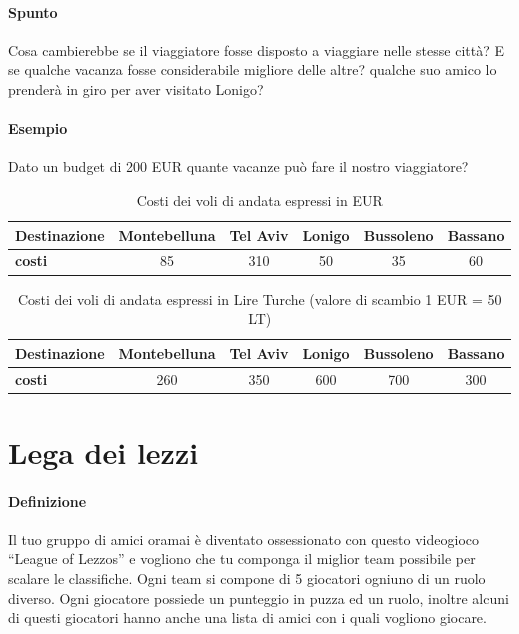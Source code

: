     \paragraph{Spunto} Cosa cambierebbe se il viaggiatore fosse disposto a viaggiare nelle stesse città? E se qualche vacanza fosse considerabile migliore delle altre? qualche suo amico lo prenderà in giro per aver visitato Lonigo?
    \paragraph{Esempio} Dato un budget di 200 EUR quante vacanze può fare il nostro viaggiatore?

    \begin{table}[h!]
        \centering
        \caption{Costi dei voli di andata espressi in EUR}
        \label{tab:costi_voli}
        \begin{tabular}{|l|c|c|c|c|c|}
        \hline
            \textbf{Destinazione} & \textbf{Montebelluna} & \textbf{Tel Aviv} & \textbf{Lonigo} & \textbf{Bussoleno} & \textbf{Bassano} \\ \hline
            \textbf{costi} & 85 & 310 & 50 & 35 & 60 \\ \hline
        \end{tabular}
    \end{table}

    \begin{table}[h!]
        \centering
        \caption{Costi dei voli di andata espressi in Lire Turche (valore di scambio 1 EUR = 50 LT)}
        \label{tab:costi_voli}
        \begin{tabular}{|l|c|c|c|c|c|}
        \hline
            \textbf{Destinazione} & \textbf{Montebelluna} & \textbf{Tel Aviv} & \textbf{Lonigo} & \textbf{Bussoleno} & \textbf{Bassano} \\ \hline
            \textbf{costi} & 260 & 350 & 600 & 700 & 300 \\ \hline
        \end{tabular}
    \end{table}

\newpage
\thispagestyle{chapterInit}
\section*{Lega dei lezzi}
    \paragraph{Definizione} Il tuo gruppo di amici oramai è diventato ossessionato con questo videogioco ``League of Lezzos'' e vogliono che tu componga il miglior team possibile per scalare le classifiche. Ogni team si compone di 5 giocatori ogniuno di un ruolo diverso. Ogni giocatore possiede un punteggio in puzza ed un ruolo, inoltre alcuni di questi giocatori hanno anche una lista di amici con i quali vogliono giocare. 
